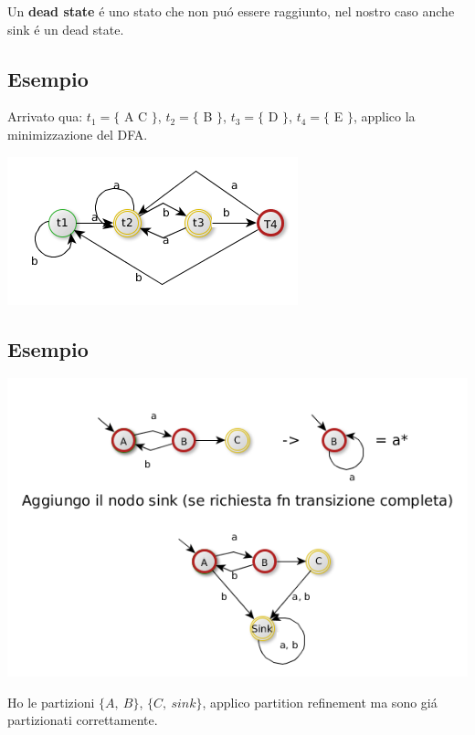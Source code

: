 Un \textbf{dead state} \'e uno stato che non pu\'o essere raggiunto, nel nostro caso anche sink \'e un dead state.

\subsection{Esempio}

Arrivato qua: $ t_1 = \{$ A C $\}$, $ t_2 = \{$ B $\}$, $ t_3 = \{$ D $\}$, $ t_4 = \{$ E $\}$,
applico la minimizzazione del DFA.

\begin{center}
	\includegraphics[scale=0.5]{Chapters/Img/c02_06.png}\\
\end{center} 

\subsection{Esempio}
\begin{center}
	\includegraphics[scale=0.5]{Chapters/Img/c02_07.png}\\
\end{center} 

Ho le partizioni $\{A,\ B\}$, $\{C,\ sink\}$, applico partition refinement ma sono gi\'a partizionati correttamente.

